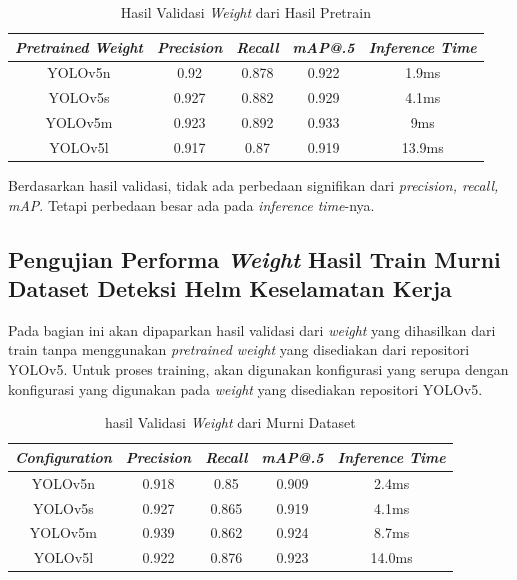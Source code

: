 \begin{longtable}{|c|c|c|c|c|}
  \caption{Hasil Validasi \emph{Weight} dari Hasil Pretrain}
  \label{tb:pretraincoco}\\
  \hline
  \rowcolor[HTML]{C0C0C0}
  \textbf{\emph{Pretrained Weight}} & \emph{Precision}  & \emph{Recall} & \emph{mAP@.5} & \emph{Inference Time}\\
  \hline
  YOLOv5n                           & 0.92               & 0.878         & 0.922         & 1.9ms              \\
  YOLOv5s                           & 0.927              & 0.882         & 0.929         & 4.1ms              \\
  YOLOv5m                           & 0.923              & 0.892         & 0.933        & 9ms                  \\
  YOLOv5l                           & 0.917              & 0.87          & 0.919         & 13.9ms                \\
  \hline
\end{longtable}

Berdasarkan hasil validasi, tidak ada perbedaan signifikan dari \emph{precision, recall, mAP}. Tetapi perbedaan besar ada pada \emph{inference time}-nya. 

\subsection{Pengujian Performa \emph{Weight} Hasil Train Murni Dataset Deteksi Helm Keselamatan Kerja}
\label{subsec:murnidataset}

Pada bagian ini akan dipaparkan hasil validasi dari \emph{weight} yang dihasilkan dari train tanpa menggunakan \emph{pretrained weight} yang disediakan dari repositori YOLOv5. Untuk proses training, akan digunakan konfigurasi yang serupa dengan konfigurasi yang digunakan pada \emph{weight} yang disediakan repositori YOLOv5.

\begin{longtable}{|c|c|c|c|c|}
  \caption{hasil Validasi \emph{Weight} dari Murni Dataset}
  \label{tb:nopretrain}\\
  \hline
  \rowcolor[HTML]{C0C0C0}
  \textbf{\emph{Configuration}} & \emph{Precision}  & \emph{Recall} & \emph{mAP@.5} & \emph{Inference Time}\\
  \hline
  YOLOv5n                           & 0.918              & 0.85         & 0.909         & 2.4ms                \\
  YOLOv5s                           & 0.927             & 0.865        & 0.919        & 4.1ms               \\
  YOLOv5m                           & 0.939            & 0.862        & 0.924        & 8.7ms                \\
  YOLOv5l                           & 0.922            & 0.876      &   0.923       &  14.0ms        \\
  \hline
\end{longtable}

